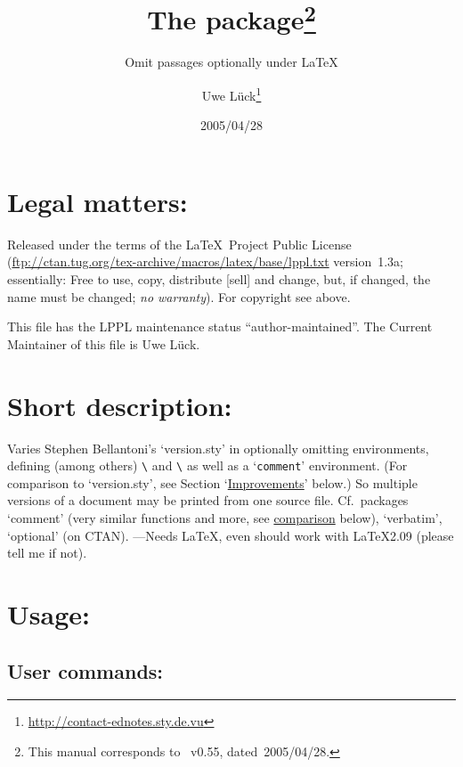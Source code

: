 \documentclass[pagesize=auto]{scrartcl}
\title{The \pkg{versions} package\thanks{This manual corresponds to \pkg{versions.sty}~v0.55, dated~2005/04/28.}}
\subtitle{Omit passages optionally under \LaTeX}
\author{Uwe Lück\thanks{\url{http://contact-ednotes.sty.de.vu}}}
\date{2005/04/28}
\makeatletter
\newcommand*{\pkg}[1]{\textsf{#1}}
\newcommand*{\cs}[1]{\texttt{\textbackslash#1}}
\newcommand*{\cmd}[1]{\cs{\expandafter\@gobble\string#1}}
\newcommand*{\env}[1]{\texttt{#1}}
\makeatother
\begin{document}
\maketitle

\section{Legal matters:}

Released under the terms of the \LaTeX\ Project Public License
(\url{ftp://ctan.tug.org/tex-archive/macros/latex/base/lppl.txt}
version~1.3a;
essentially: Free to use, copy, distribute [sell] and change,
but, if changed, the name must be changed; \emph{no warranty}).
For copyright see above.

This file has the LPPL maintenance status ``author-maintained''.
The Current Maintainer of this file is Uwe Lück.


\section{Short description:}
\label{sec:short}

Varies Stephen Bellantoni's `\pkg{version.sty}' in optionally omitting
environments, defining (among others) \cmd{} and
\cmd{\excludeversion} as well as a `\env{comment}' environment. (For comparison
to `\pkg{version.sty}', see Section `\hyperref[sec:version]{Improvements}' below.) So
multiple versions of a document may be printed from one source file.
Cf.~packages `\pkg{comment}' (very similar functions and more, see
\hyperref[sec:comment]{comparison} below), `\pkg{verbatim}', `\pkg{optional}' (on CTAN).
---Needs \LaTeX, even should work with \LaTeX 2.09
(please tell me if not).


\section{Usage:}

\subsection{User commands:}
\label{sec:user}
\end{document}
